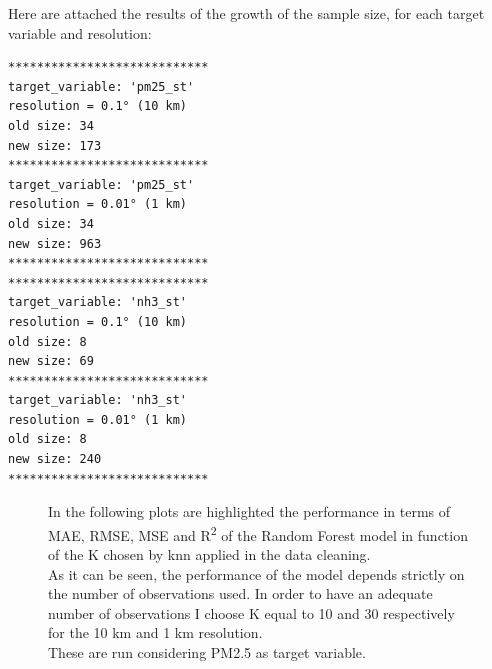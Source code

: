 \pagebreak
Here are attached the results of the growth of the sample size, for each target variable and resolution:
\begin{multicols}{2}
\begin{verbatim}
****************************
target_variable: 'pm25_st'
resolution = 0.1° (10 km)
old size: 34
new size: 173 
****************************
target_variable: 'pm25_st'
resolution = 0.01° (1 km)
old size: 34
new size: 963 
****************************
****************************
target_variable: 'nh3_st'
resolution = 0.1° (10 km)
old size: 8
new size: 69 
****************************
target_variable: 'nh3_st'
resolution = 0.01° (1 km)
old size: 8
new size: 240 
****************************
\end{verbatim}
\end{multicols}
\begin{figure}[H] 
    \centering
    \hfill%
    \caption{In the following plots are highlighted the performance in terms of MAE, RMSE, MSE and R\textsuperscript{2} of the Random Forest model in function of the K chosen by \acrshort{knn} applied in the data cleaning.\\
    As it can be seen, the performance of the model depends strictly on the number of observations used. In order to have an adequate number of observations I choose K equal to 10 and 30 respectively for the 10 km and 1 km resolution. \\
    These are run considering PM2.5 as target variable.}
    \label{fig:knn_chosen}
\end{figure}
